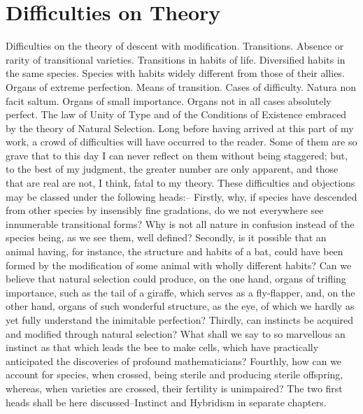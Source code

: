 \chapter{Difficulties on Theory}
Difficulties on the theory of descent with modification. Transitions. Absence or rarity of transitional varieties. Transitions in habits of life. Diversified habits in the same species. Species with habits widely different from those of their allies. Organs of extreme perfection. Means of transition. Cases of difficulty. Natura non facit saltum. Organs of small importance. Organs not in all cases absolutely perfect. The law of Unity of Type and of the Conditions of Existence embraced by the theory of Natural Selection.
Long before having arrived at this part of my work, a crowd of difficulties will have occurred to the reader. Some of them are so grave that to this day I can never reflect on them without being staggered; but, to the best of my judgment, the greater number are only apparent, and those that are real are not, I think, fatal to my theory.
These difficulties and objections may be classed under the following heads:--
Firstly, why, if species have descended from other species by insensibly fine gradations, do we not everywhere see innumerable transitional forms? Why is not all nature in confusion instead of the species being, as we see them, well defined?
Secondly, is it possible that an animal having, for instance, the structure and habits of a bat, could have been formed by the modification of some animal with wholly different habits? Can we believe that natural selection could produce, on the one hand, organs of trifling importance, such as the tail of a giraffe, which serves as a fly-flapper, and, on the other hand, organs of such wonderful structure, as the eye, of which we hardly as yet fully understand the inimitable perfection?
Thirdly, can instincts be acquired and modified through natural selection? What shall we say to so marvellous an instinct as that which leads the bee to make cells, which have practically anticipated the discoveries of profound mathematicians?
Fourthly, how can we account for species, when crossed, being sterile and producing sterile offspring, whereas, when varieties are crossed, their fertility is unimpaired?
The two first heads shall be here discussed--Instinct and Hybridism in separate chapters.

